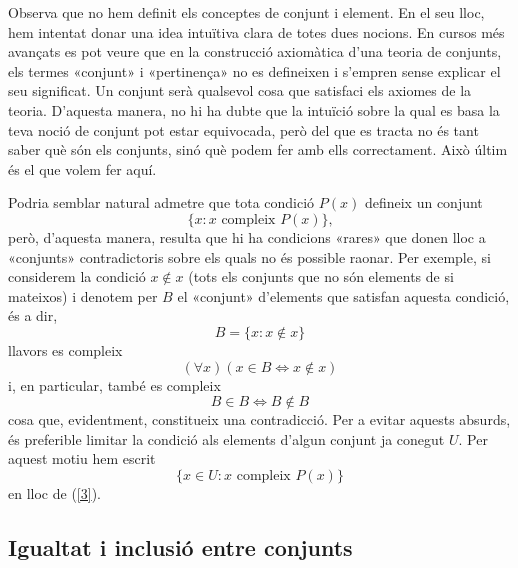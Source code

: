 \begin{observacio}
Observa que no hem definit els conceptes de conjunt i element. En el seu
lloc, hem intentat donar una idea intuïtiva clara de totes dues
nocions. En cursos més avançats es pot veure que en la construcció axiomàtica d'una teoria de conjunts, els termes «conjunt» i «pertinença» no es defineixen i s'empren sense explicar el seu
significat. Un conjunt serà qualsevol cosa que satisfaci els axiomes de
la teoria. D'aquesta manera, no hi ha dubte que la intuïció sobre
la qual es basa la teva noció de conjunt pot estar equivocada, però
del que es tracta no és tant saber què són els conjunts, sinó què podem fer amb ells correctament. Això últim és el que
volem fer aquí.
\end{observacio}

\begin{observacio}
Podria semblar natural admetre que tota condició $P(x)$ defineix un
conjunt%
\begin{equation}
\{x:x\text{ compleix }P(x)\}\text{,}   \label{3}
\end{equation}
però, d'aquesta manera, resulta que hi ha condicions «rares» que donen lloc a «conjunts» contradictoris sobre els quals no és
possible raonar. Per exemple, si considerem la condició $x\notin x$
(tots els conjunts que no són elements de si mateixos) i denotem per $B$
el «conjunt» d'elements que satisfan
aquesta condició, és a dir,%
\begin{equation*}
B=\{x:x\notin x\}
\end{equation*}
llavors es compleix%
\begin{equation*}
\left( \forall x\right) (x\in B\Longleftrightarrow x\notin x)
\end{equation*}
i, en particular, també es compleix%
\begin{equation*}
B\in B\Longleftrightarrow B\notin B
\end{equation*}
cosa que, evidentment, constitueix una contradicció. Per a evitar aquests
absurds, és preferible limitar la condició als elements d'algun
conjunt ja conegut $U$. Per aquest motiu hem escrit%
\begin{equation*}
\{x\in U:x\text{ compleix }P(x)\text{\}}
\end{equation*}
en lloc de (\ref{3}).
\end{observacio}

\subsection{Igualtat i inclusió entre conjunts}

